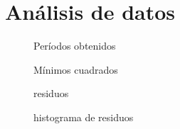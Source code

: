\section{Análisis de datos}


\begin{figure}[H]
    \centering
    
    \caption{Períodos obtenidos}
    \label{fig:datos:periodos}
\end{figure}

\begin{figure}[H]
    \centering
    
    \caption{Mínimos cuadrados}
    \label{fig:datos:regresion}
\end{figure}

\begin{figure}[H]
    \centering
    
    \caption{residuos}
    \label{fig:datos:residuos}
\end{figure}

\begin{figure}[H]
    \centering
    
    \caption{histograma de residuos}
    \label{fig:datos:histograma}
\end{figure}
